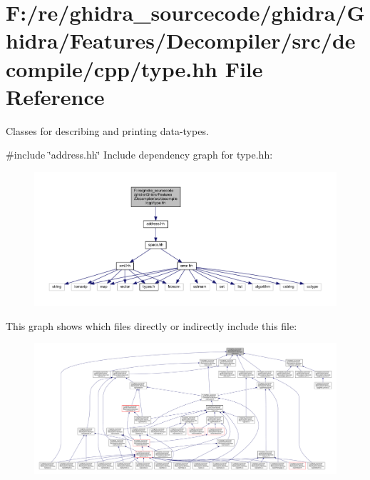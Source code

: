 \hypertarget{type_8hh}{}\section{F\+:/re/ghidra\+\_\+sourcecode/ghidra/\+Ghidra/\+Features/\+Decompiler/src/decompile/cpp/type.hh File Reference}
\label{type_8hh}


Classes for describing and printing data-\/types.  


{\ttfamily \#include \char`\"{}address.\+hh\char`\"{}}\newline
Include dependency graph for type.\+hh\+:
\nopagebreak
\begin{figure}[H]
\begin{center}
\leavevmode
\includegraphics[width=350pt]{type_8hh__incl}
\end{center}
\end{figure}
This graph shows which files directly or indirectly include this file\+:
\nopagebreak
\begin{figure}[H]
\begin{center}
\leavevmode
\includegraphics[width=350pt]{type_8hh__dep__incl}
\end{center}
\end{figure}

